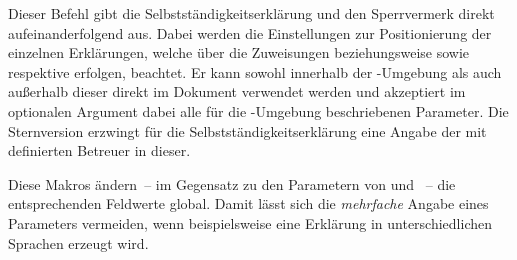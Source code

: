 \begin{DeclareEntity*}{}
\begin{DeclareEntity*}{}
\begin{DeclareEntity*}{}
\begin{Declaration}
\begin{Declaration}
\begin{Declaration}
\begin{Declaration}
\begin{Declaration}
\begin{Declaration}
\begin{Declaration}
\begin{Declaration}
\begin{Declaration}
\begin{Declaration}
\begin{Declaration}
Dieser Befehl gibt die Selbstständigkeitserklärung und den Sperrvermerk direkt 
aufeinanderfolgend aus. Dabei werden die Einstellungen zur Positionierung der 
einzelnen Erklärungen, welche über die Zuweisungen  
beziehungsweise  sowie  
respektive  erfolgen, beachtet. Er kann sowohl 
innerhalb der -Umgebung als auch außerhalb dieser 
direkt im Dokument verwendet werden und akzeptiert im optionalen Argument dabei 
alle für die -Umgebung beschriebenen Parameter. 
%
Die Sternversion erzwingt für die Selbstständigkeitserklärung eine Angabe der 
mit  definierten Betreuer in dieser.
\end{Declaration}
\end{Declaration}
\end{Declaration}
\end{Declaration}
\end{Declaration}
\end{Declaration}
\end{Declaration}
\end{Declaration}
\end{Declaration}
\end{Declaration}
\end{Declaration}

\begin{Declaration}
  {}
\begin{Declaration}
  {}
\begin{Declaration}
  {}
\begin{Declaration}
  {}
\printdeclarationlist

Diese Makros ändern~-- im Gegensatz zu den Parametern von 
 und ~-- die entsprechenden Feldwerte 
global. Damit lässt sich die \emph{mehrfache} Angabe eines Parameters 
vermeiden, wenn beispielsweise eine Erklärung in unterschiedlichen Sprachen 
erzeugt wird.%
\end{Declaration}
\end{Declaration}
\end{Declaration}
\end{Declaration}
%
%




\end{DeclareEntity*}
\end{DeclareEntity*}
\end{DeclareEntity*}
